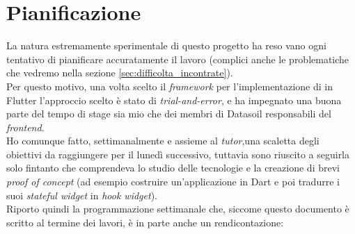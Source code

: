 \section{Pianificazione}
\label{sec:pianificazione}
La natura estremamente sperimentale di questo progetto ha reso vano ogni tentativo di pianificare accuratamente il lavoro (complici anche le problematiche che vedremo nella sezione \ref{sec:difficolta_incontrate}).\\
Per questo motivo, una volta scelto il \textit{framework} per l'implementazione di \asa{} in Flutter l'approccio scelto è stato di \textit{trial-and-error}, e ha impegnato una buona parte del tempo di stage sia mio che dei membri di Datasoil responsabili del \textit{frontend}.\\
Ho comunque fatto, settimanalmente e assieme al \textit{tutor},una scaletta degli obiettivi da raggiungere per il lunedì successivo, tuttavia sono riuscito a seguirla solo fintanto che comprendeva lo studio delle tecnologie e la creazione di brevi \textit{proof of concept} (ad esempio costruire un'applicazione in Dart e poi tradurre i suoi \textit{stateful widget} in \textit{hook widget}).\\
Riporto quindi la programmazione settimanale che, siccome questo documento è scritto al termine dei lavori, è in parte anche un rendicontazione:


